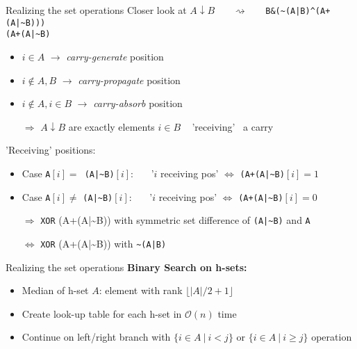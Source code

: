 \documentclass[18pt]{beamer}
\begin{document}
 \begin{frame}{Realizing the set operations}
 	Closer look at $A \downarrow B$ \ \ \ $\rightsquigarrow$ \ \ \  \texttt{B\&(\textasciitilde(A|B)\^{}(A+(A|\textasciitilde B)))} \\
 	\bigskip 
 	{\color{blue} \texttt{(A+(A|\textasciitilde B)}}
 	\begin{itemize}
 		\item $i \in A$ $\rightarrow$ \emph{carry-generate} position
 		\item $i \notin A,B$ $\rightarrow$ \emph{carry-propagate} position
 		\item $i \notin A, i \in B$ $\rightarrow$ \emph{carry-absorb} position
 		\item [$\Rightarrow$] $A \downarrow B$ are exactly elements $i \in B$ \ {\color{blue} 'receiving'} \ a carry
 	\end{itemize}
 	\bigskip
 	\pause
    'Receiving' positions:
    \begin{itemize}
    	\item Case \texttt{A}$[i] = $\ \texttt{(A|\textasciitilde B)}$[i]$: \ \ \ '$i$ receiving pos' $\Leftrightarrow$ \texttt{(A+(A|\textasciitilde B)}$[i] = 1$
    	\item Case \texttt{A}$[i] \neq$ \texttt{(A|\textasciitilde B)}$[i]$: \ \ \ '$i$ receiving pos' $\Leftrightarrow$ \texttt{(A+(A|\textasciitilde B)}$[i] = 0$
    	\item [$\Rightarrow$] \texttt{XOR} (A+(A|\textasciitilde B)) with symmetric set difference of \texttt{(A|\textasciitilde B)} and \texttt{A}
    	\item [$\Leftrightarrow$] \texttt{XOR} (A+(A|\textasciitilde B)) with \texttt{\textasciitilde(A|B)}
    \end{itemize}
\end{frame}
\begin{frame}{Realizing the set operations}
	\textbf{Binary Search on h-sets:}
	\begin{itemize}
		\item Median of h-set $A$:  element with rank $\lfloor|A|/2 + 1\rfloor$
		\item Create look-up table for each h-set in $\mathcal{O}(n)$ time
		\item Continue on left/right branch with $\{i \in A \ | \ i < j\}$ or $\{i \in A  \ | \ i \ge j\}$ operation
	\end{itemize}
\end{frame}
\end{document}
